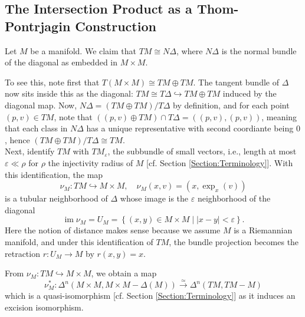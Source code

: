 \documentclass[reqno]{amsart}
\theoremstyle{definition}
\theoremstyle{remark}
\DeclareMathOperator{\im}{im}
\begin{document}
      \subsection{The Intersection Product as a 
      Thom-Pontrjagin Construction}

      Let $M$ be a manifold. We claim that
      $TM \cong N \Delta$, where
      $N \Delta$ is the normal bundle of the
      diagonal as embedded in $M \times M$.

      To see this, note first that
      $T\left( M \times M \right) \cong
      T M \oplus TM$. The tangent bundle
      of $\Delta$ now sits inside this as
      the diagonal:
      $TM \cong T\Delta \hookrightarrow TM \oplus TM$ induced
      by the diagonal map. Now,
      $N \Delta = \left( TM \oplus TM \right) / T\Delta$ by definition,
      and 
      for each point $(p,v) \in TM$, 
      note that
      $((p,v) \oplus TM) \cap T \Delta  = 
      \left( (p,v) , (p,v) \right) $, meaning that each
      class in $N \Delta$ has a unique representative with
      second coordiante being $0$, hence
      $\left( TM \oplus TM \right) / T \Delta \cong
      TM$.\\
      \linebreak
      Next, identify $TM$ with
      $TM_{\varepsilon}$, the subbundle of small vectors, i.e.,
      length at most $\varepsilon \ll \rho $ for $\rho $ 
      the injectivity radius of $M $ 
      [cf. Section \ref{Section:Terminology}].
      With this identification, the map
       \[
      \nu_M \colon TM \hookrightarrow M \times M, \quad
      \nu_M (x,v) = \left( x, \exp_x(v) \right) 
      \] 
      is a tubular neighborhood of $\Delta$ whose image
      is the $\varepsilon$ neighborhood of the diagonal
      \[
      \im \nu_M = U_M
      = \left\{ \left( x,y \right) \in M \times M
       \mid  \left| x-y \right| < \varepsilon \right\} .
      \] 
      Here the notion of distance makes sense because we
      assume $M$ is a Riemannian manifold, and
      under this identification of $TM$,
      the bundle projection becomes
    the retraction
    $r \colon U_M \to M$ by $r(x,y) = x$. 

    From $\nu_M \colon TM \hookrightarrow M \times M$, we obtain
    a map
    \[
    \nu_M^{*} \colon 
    \Delta^{n}\left( M \times M, M \times M - \Delta(M) \right) 
    \stackrel{\simeq}{\to} \Delta^{n}\left( TM, TM - M \right) 
    \] 
    which is a quasi-isomorphism [cf. Section \ref{Section:Terminology}]
    as it induces an excision isomorphism.
\end{document}
